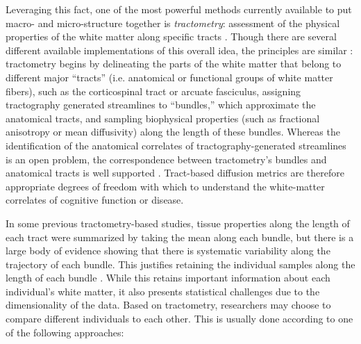 Leveraging this fact, one of the most powerful methods currently
available to put macro- and micro-structure together is
\emph{tractometry}: assessment of the physical properties of the white
matter along specific tracts \cite{Bells2011-cf}. Though there are
several different available implementations of this overall idea,
the principles are similar \cite{yeatman2012tract, Yendiki2011-ay,
Wassermann2016-iv, ODonnell2009-uu}: tractometry begins by delineating
the parts of the white matter that belong to different major ``tracts''
(i.e. anatomical or functional groups of white matter fibers),
such as the corticospinal tract or arcuate fasciculus, assigning
tractography generated streamlines to ``bundles,'' which approximate
the anatomical tracts, and sampling biophysical properties (such as
fractional anisotropy or mean diffusivity) along the length of these
bundles. Whereas the identification of the anatomical correlates
of tractography-generated streamlines is an open problem, the
correspondence between tractometry's bundles and anatomical tracts is
well supported \cite{Catani2002-vu}. Tract-based diffusion metrics are
therefore appropriate degrees of freedom with which to understand the
white-matter correlates of cognitive function or disease.

In some previous tractometry-based studies, tissue properties along
the length of each tract were summarized by taking the mean along
each bundle, but there is a large body of evidence showing that there
is systematic variability along the trajectory of each bundle. This
justifies retaining the individual samples along the length of each
bundle \cite{yeatman2012tract, colby2012, ODonnell2009-uu}. While this
retains important information about each individual's white matter, it
also presents statistical challenges due to the dimensionality of the
data. Based on tractometry, researchers may choose to compare different
individuals to each other. This is usually done according to one of the
following approaches:


